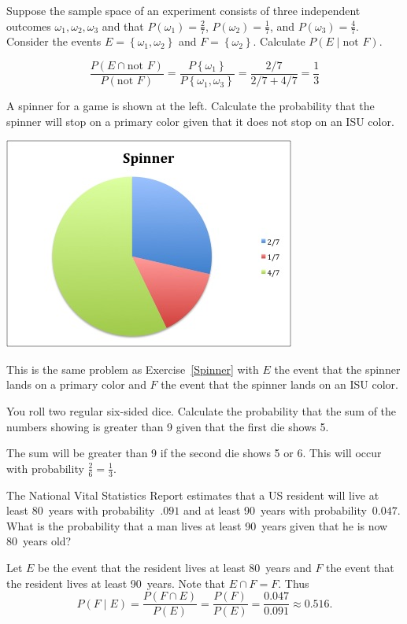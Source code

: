 \documentclass[12pt]{exam}
\begin{document}
\begin{questions}
\question\label{Spinner} Suppose the sample space of an experiment
consists of three independent
outcomes $\omega_1,\omega_2,\omega_3$ and that
$P\left(\omega_1\right)=\frac{2}{7}$, $P\left(\omega_2\right)=\frac{1}{7}$,
and $P\left(\omega_3\right)=\frac{4}{7}$. Consider the events
$E=\left\{\omega_1,\omega_2\right\}$ and $F=\left\{\omega_2\right\}$.
Calculate $P\left(E\mid\text{not $F$}\right)$.
\begin{solution}
\[\frac{P\left(E\cap\text{not $F$}\right)}
{P\left(\text{not $F$}\right)}
=\frac{P\left\{\omega_1\right\}}{P\left\{\omega_1,\omega_3\right\}}
=\frac{2/7}{2/7+4/7}=\frac{1}{3}\]
\end{solution}

\begin{multicols}{2}
\question A spinner for a game is shown at the left.
Calculate the probability that the spinner will stop
on a primary color given that it does not stop on an ISU color.
\begin{center}\includegraphics[scale=.6]{ReviewSpinner}\end{center}
\end{multicols}
\begin{solution} This is the same problem as Exercise~\ref{Spinner}
with $E$ the event that the spinner lands on a primary
color and $F$ the event that the spinner lands on an ISU color.
\end{solution}

\question You roll two regular six-sided dice. Calculate the probability
that the sum of the numbers showing is greater than 9 given that
the first die shows 5.
\begin{solution} The sum will be greater than 9 if the second die
shows 5 or 6.
This will occur with probability $\frac{2}{6}=\frac{1}{3}$.
\end{solution}

\question The National Vital Statistics Report estimates
that a US resident will live at least 80~years with probability~$.091$
and at least 90~years with probability~$0.047$.
What is the probability that a man lives at least 90~years
given that he is now 80~years old?
\begin{solution}
Let $E$ be the event that the resident lives at least 80~years
and $F$ the event that the resident lives at least 90~years.
Note that $E\cap F=F$. Thus
\[P\left(F\mid E\right)
=\frac{P\left(F\cap E\right)}{P\left(E\right)}
=\frac{P\left(F\right)}{P\left(E\right)}
=\frac{0.047}{0.091}\approx 0.516.\]
\end{solution}


\end{questions}
\end{document}
